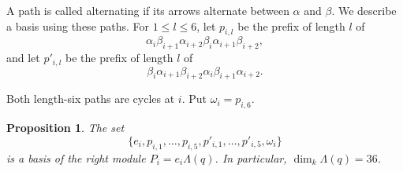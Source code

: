 \documentclass[a4paper,reqno,10pt]{amsart}
\newtheorem{proposition}[theorem]{Proposition}
\theoremstyle{definition}
\numberwithin{equation}{section}
\newcommand{\kfield}{k}
\begin{document}
A path is called alternating if its arrows alternate between $\alpha$
and $\beta$. We describe a basis using these paths. For $1\leq l\leq6$, let
$p_{i,l}$ be the prefix of length $l$ of
\[
 \alpha_i\beta_{i+1}\alpha_{i+2}
 \beta_i\alpha_{i+1}\beta_{i+2},
\]
and let $p'_{i,l}$ be the prefix of length $l$ of
\[
 \beta_i\alpha_{i+1}\beta_{i+2}
 \alpha_i\beta_{i+1}\alpha_{i+2}.
\]

Both length-six paths are cycles at $i$. Put $\omega_i=p_{i,6}$.

\begin{proposition}
\label{prop:path-basis}
The set
\begin{equation}
 \{e_i,p_{i,1},\ldots,p_{i,5},
 p'_{i,1},\ldots,p'_{i,5},\omega_i\}
 \label{eq:projective-basis}
\end{equation}
is a basis of the right module
$P_i=e_i\Lambda(q)$. In particular, $\dim_\kfield\Lambda(q)=36$.
\end{proposition}
\end{document}
